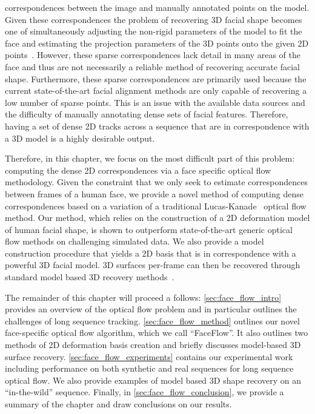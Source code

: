 correspondences between the image and manually annotated points on the model.
Given these correspondences the problem of recovering 3D facial shape becomes
one of simultaneously adjusting the non-rigid parameters of the model to fit
the face and estimating the projection parameters of the 3D points onto the given
2D points~\cite{aldrian2010linear,aldrian2013inverse,bas2016fitting}.
However, these sparse correspondences lack
detail in many areas of the face and thus are not necessarily a reliable method
of recovering accurate facial shape. Furthermore, these sparse correspondences
are primarily used because the current state-of-the-art facial 
alignment methods are only capable of recovering a low number of sparse points.
This is an issue with the available data sources and the difficulty of manually
annotating dense sets of facial features. Therefore, having a set of dense
2D tracks across a sequence that are in correspondence with a 3D model is a
highly desirable output.

Therefore, in this chapter, we focus on the most difficult part of this 
problem: computing the dense 2D correspondences via a face specific
optical flow methodology. Given the constraint
that we only seek to estimate correspondences between frames of a human face,
we provide a novel method of computing dense correspondences based on a variation
of a traditional Lucas-Kanade~\cite{lucas1981iterative} optical flow method.
Our method, which relies on the construction of a 2D deformation model of
human facial shape, is shown to outperform state-of-the-art generic optical flow
methods on challenging simulated data. We also provide a model construction
procedure that yields a 2D basis that is in correspondence with a powerful
3D facial model. 3D surfaces per-frame can then be recovered through standard
model based 3D recovery methods~\cite{aldrian2010linear,aldrian2013inverse,bas2016fitting}.


The remainder of this chapter will proceed a follows: \cref{sec:face_flow_intro}
provides an overview of the optical flow problem and in particular
outlines the challenges of long sequence tracking. \cref{sec:face_flow_method}
outlines our novel face-specific optical flow algorithm, which we call
``FaceFlow''. It also outlines two methods of 2D deformation basis
creation and briefly discusses model-based 3D surface recovery.
\cref{sec:face_flow_experiments} contains our experimental work
including performance on both synthetic and real sequences for long
sequence optical flow. We also provide examples of model based 3D shape recovery
on an ``in-the-wild'' sequence. Finally, in \cref{sec:face_flow_conclusion},
we provide a summary of the chapter and draw conclusions on our results.
{






}
\stopcontents[chapters]
